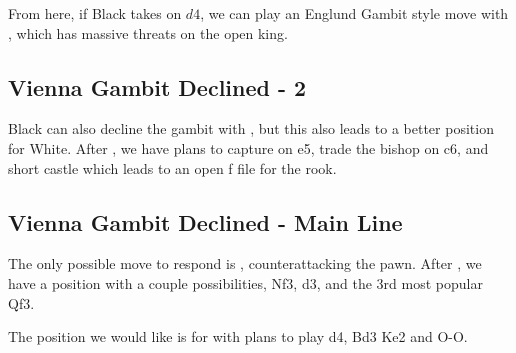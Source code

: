 \documentclass[12pt]{scrartcl}
\begin{document}
 From here, if Black takes on $d4$, we can play an Englund Gambit style move with , which has massive threats on the open king.
\pagebreak
\subsection{Vienna Gambit Declined - 2}
\newgame
{}
Black can also decline the gambit with , but this also leads to a better position for White.  After , we have plans to capture on e5, trade the bishop on c6, and short castle which leads to an open f file for the rook.
\begin{center}
\showboard
\end{center}
\pagebreak
\subsection{Vienna Gambit Declined - Main Line}
\newgame
{}
The only possible move to respond is , counterattacking the pawn. After , we have a position with a couple possibilities, Nf3, d3, and the 3rd most popular Qf3.
\begin{center}
\showboard
\end{center}
The position we would like is for  with plans to play d4, Bd3 Ke2 and O-O.
\begin{center}
\showboard
\end{center}
\end{document}
